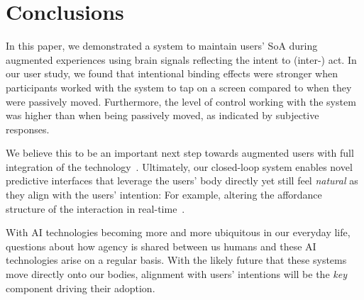 \section{Conclusions}
In this paper, we demonstrated a system to maintain users' SoA during augmented experiences using brain signals reflecting the intent to (inter-) act. In our user study, we found that intentional binding effects were stronger when participants worked with the system to tap on a screen compared to when they were passively moved. Furthermore, the level of control working with the system was higher than when being passively moved, as indicated by subjective responses.

We believe this to be an important next step towards augmented users with full integration of the technology~\cite{Mueller2020-dl}. Ultimately, our closed-loop system enables novel predictive interfaces that leverage the users' body directly yet still feel \textit{natural} as they align with the users' intention: For example, altering the affordance structure of the interaction in real-time~\cite{Gehrke2022-kz, Lopes2015-ze, Nataraj2020-wm}.

With AI technologies becoming more and more ubiquitous in our everyday life, questions about how agency is shared between us humans and these AI technologies arise on a regular basis. With the likely future that these systems move directly onto our bodies, alignment with users' intentions will be the \textit{key} component driving their adoption.